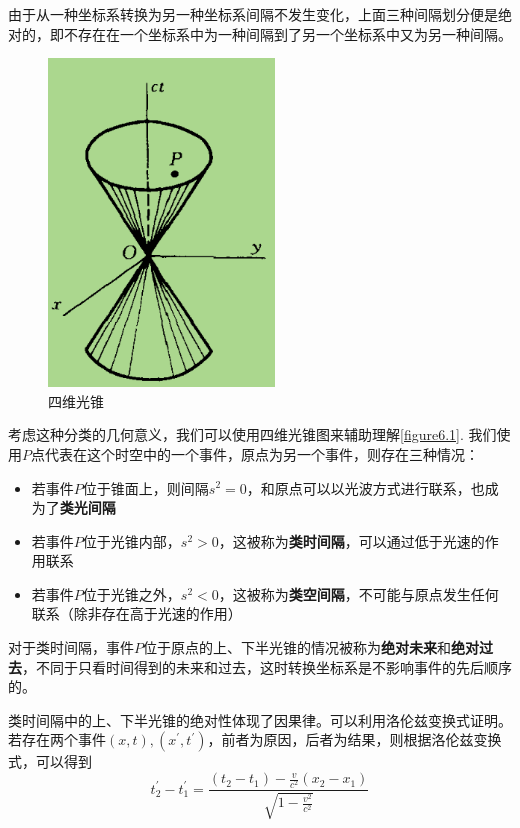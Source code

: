 \documentclass[UTF8]{ctexart}
\begin{document}
\noindent 由于从一种坐标系转换为另一种坐标系间隔不发生变化，上面三种间隔划分便是绝对的，即不存在在一个坐标系中为一种间隔到了另一个坐标系中又为另一种间隔。
\newpage
\begin{figure}
    \centering
    \includegraphics[width=6cm]{figure6-1.png}
    \caption{四维光锥}
    \label{figure6.1}
\end{figure}

    考虑这种分类的几何意义，我们可以使用四维光锥图来辅助理解\autoref{figure6.1}. 我们使用$P$点代表在这个时空中的一个事件，原点为另一个事件，则存在三种情况：
    \begin{itemize}
        \item 若事件$P$位于锥面上，则间隔$s^2 = 0$，和原点可以以光波方式进行联系，也成为了\textbf{类光间隔}
        \item 若事件$P$位于光锥内部，$s^2>0$，这被称为\textbf{类时间隔}，可以通过低于光速的作用联系
        \item 若事件$P$位于光锥之外，$s^2<0$，这被称为\textbf{类空间隔}，不可能与原点发生任何联系（除非存在高于光速的作用）
    \end{itemize}

\noindent 对于类时间隔，事件$P$位于原点的上、下半光锥的情况被称为\textbf{绝对未来}和\textbf{绝对过去}，不同于只看时间得到的未来和过去，这时转换坐标系是不影响事件的先后顺序的。

    类时间隔中的上、下半光锥的绝对性体现了因果律。可以利用洛伦兹变换式证明。若存在两个事件$(x,t),(x^{\prime},t^{\prime})$，前者为原因，后者为结果，则根据洛伦兹变换式，可以得到
    \begin{equation}
        t_2^{\prime} - t_1^{\prime} = \frac{(t_2-t_1)-\frac{v}{c^2}(x_2-x_1)}{\sqrt{1-\frac{v^2}{c^2}}}
    \end{equation}
\end{document}
